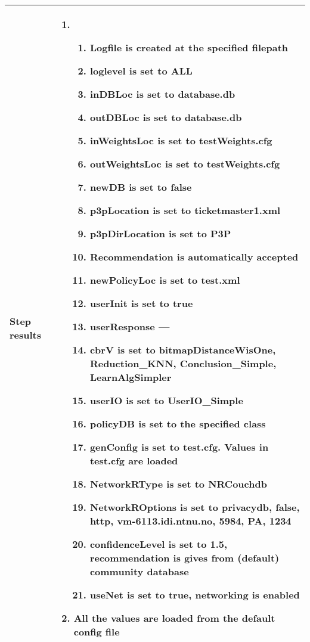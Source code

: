 \begin{center}
\begin{longtable}{ | p{4cm} | p{10cm} | }
			Step results & 	\begin{enumerate}
							\item
							\begin{enumerate}
								\item Logfile is created at the specified filepath
								\item loglevel is set to ALL
								\item inDBLoc is set to database.db
								\item outDBLoc is set to database.db
								\item inWeightsLoc is set to testWeights.cfg
								\item outWeightsLoc is set to testWeights.cfg
								\item newDB is set to false
								\item p3pLocation is set to ticketmaster1.xml
								\item p3pDirLocation is set to P3P
								\item Recommendation is automatically accepted
								\item newPolicyLoc is set to test.xml
								\item userInit is set to true
								\item userResponse ---
								\item cbrV is set to bitmapDistanceWisOne, Reduction\_KNN, Conclusion\_Simple, LearnAlgSimpler
								\item userIO is set to UserIO\_Simple
								\item policyDB is set to the specified class
								\item genConfig is set to test.cfg. Values in test.cfg are loaded
								\item NetworkRType is set to NRCouchdb
								\item NetworkROptions is set to privacydb, false, http, vm-6113.idi.ntnu.no, 5984, PA, 1234
								\item confidenceLevel is set to 1.5, recommendation is gives from (default) community database
								\item useNet is set to true, networking is enabled
							\end{enumerate}
							\item All the values are loaded from the default config file
						\end{enumerate} \\ [3pt] \hline


\end{longtable}
\end{center}
